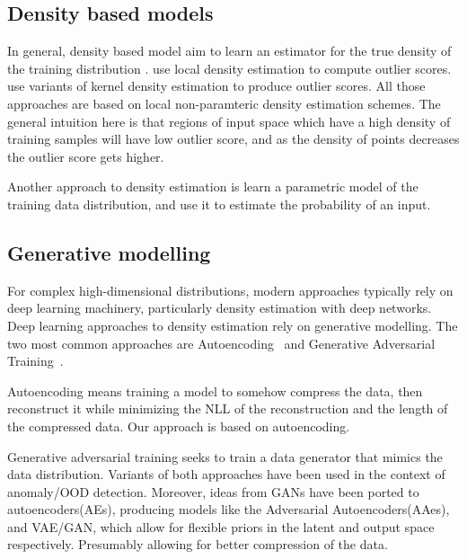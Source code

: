 \documentclass[../main.tex]{subfiles}
\begin{document}
\subsection{Density based models}

In general, density based model aim to learn an estimator for the true density of the training distribution . 
\citep{breunig2000lof, zhang2009new} use local density estimation to compute outlier scores. \citep{qin2016kelos, he2004novelty, bishop1994novelty} use variants of kernel density estimation to produce outlier scores. All those approaches are based on local non-paramteric density estimation schemes. The general intuition here is that regions of input space which have a high density of training samples will have low outlier score, and as the density of points decreases the outlier score gets higher. 

Another approach to density estimation is learn a parametric model of the training data distribution, and use it to estimate the probability of an input. 


\subsection{Generative modelling}

For complex high-dimensional distributions, modern approaches typically rely on deep learning machinery, particularly density estimation with deep networks. Deep learning approaches to density estimation rely on generative modelling. The two most common approaches are Autoencoding~\cite{kingma2013auto} and Generative Adversarial Training~\cite{goodfellow2014generative}. 

Autoencoding means training a model to somehow compress the data, then reconstruct it while minimizing the NLL of the reconstruction and the length of the compressed data. Our approach is based on autoencoding. 

Generative adversarial training seeks to train a data generator that mimics the data distribution. Variants of both approaches have been used in the context of anomaly/OOD detection. Moreover, ideas from GANs have been ported to autoencoders(AEs), producing models like the Adversarial Autoencoders(AAes)\citep{makhzani2015adversarial}, and VAE/GAN\citep{larsen2015autoencoding}, which allow for flexible priors in the latent and output space respectively. Presumably allowing for better compression of the data.
\end{document}
